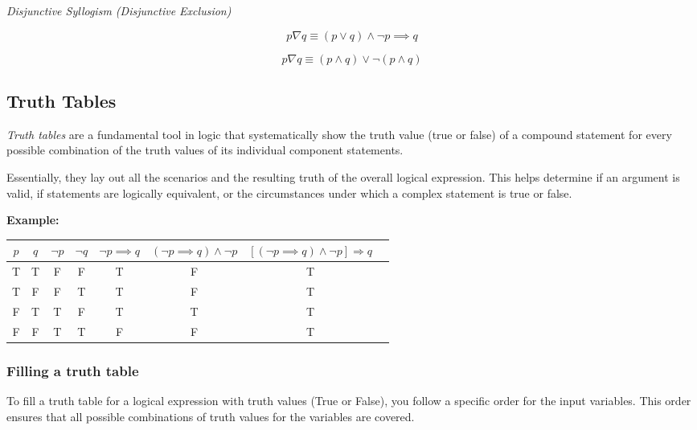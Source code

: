 \emph{Disjunctive Syllogism (Disjunctive Exclusion)}

\[
	p \nabla q \equiv (p \lor q) \land \neg p \implies q
\]

\[
	p \nabla q \equiv(p \land q) \lor \neg  (p \land q)
\]

\subsection{Truth Tables}

\emph{Truth tables} are a fundamental tool in logic that systematically show the truth value
(true or false) of a compound statement for every possible combination of the truth values of 
its individual component statements.

Essentially, they lay out all the scenarios and the resulting truth of the overall logical expression.
This helps determine if an argument is valid, if statements are logically equivalent, or the circumstances
under which a complex statement is true or false.

\textbf{Example:}

\begin{center}
	\begin{tabular}{|c|c|c|c|c|c|c|c|}
		\hline
		\(p\) & \(q\) & \(\neg p\) & \(\neg q\) & \(\neg p \implies q\) & \((\neg p \implies q) \land \neg p\) & \(\left[(\neg p \implies q) \land \neg p\right] \Rightarrow q\) \\
		\hline
		T   & T   & F        & F        & T                      & F                                     & T                                                                \\
		T   & F   & F        & T        & T                      & F                                     & T                                                                \\
		F   & T   & T        & F        & T                      & T                                     & T                                                                \\
		F   & F   & T        & T        & F                      & F                                     & T                                                                \\
		\hline
	\end{tabular}
\end{center}

\subsubsection{Filling a truth table}
To fill a truth table for a logical expression with truth values (True or False), you follow a 
specific order for the input variables. This order ensures that all possible combinations of truth values 
for the variables are covered.

